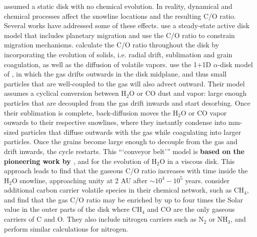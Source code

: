 \documentclass[apj]{emulateapj}
\newcommand{\emgr}[1]{\emph{ \color{gray} #1}}
\begin{document}
 
\citet{oberg11} assumed a static disk with no chemical evolution. In reality, dynamical and chemical processes affect the snowline locations and the resulting C/O ratio. Several works have addressed some of these effects. \citet{madhu14} use a steady-state active disk model that includes planetary migration and use the C/O ratio to constrain migration mechanisms. \citet{alidib14} calculate the C/O ratio throughout the disk by incorporating the evolution of solids, i.e. radial drift, sublimation and grain coagulation, as well as the diffusion of volatile vapors. \citet{alidib14} use the 1+1D $\alpha$-disk model of \citet{hughes10}, in which the gas drifts outwards in the disk midplane, and thus small particles that are well-coupled to the gas will also advect outward. Their model assumes a cyclical conversion between H$_2$O or CO dust and vapor: large enough particles that are decoupled from the gas drift inwards and start desorbing. Once their sublimation is complete, back-diffusion moves the H$_2$O or CO vapor ouwards to their respective snowlines, where they instantly condense into mm-sized particles that diffuse outwards with the gas while coagulating into larger particles. Once the grains become large enough to decouple from the gas and drift inwards, the cycle restarts. This ```conveyor belt''' model is \textbf{based on the pioneering work by \citet{cuzzi04}}, and \citet{ciesla06} for the evolution of H$_2$O in a viscous disk. This approach leads \citet{alidib14} to find that the gaseous C/O ratio increases with time inside the H$_2$O snowline, approaching unity at 2 AU after $\sim$$10^4-10^5$ years.  \citet{thiabaud15} consider additional carbon carrier volatile species in their chemical network, such as CH$_4$, and find that the gas C/O ratio may be enriched by up to four times the Solar value in the outer parts of the disk where CH$_4$ and CO are the only gaseous carriers of C and O.  They also include nitrogen carriers such as N$_2$ or NH$_3$, and perform similar calculations for nitrogen. 
\end{document}
